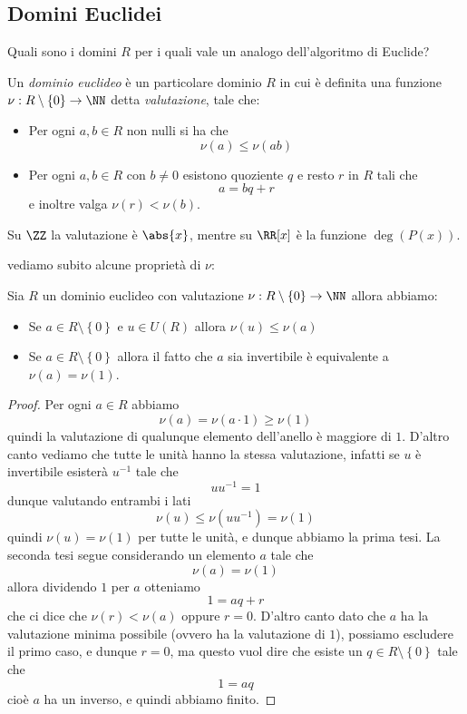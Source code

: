 \documentclass[11pt]{scrartcl}
\begin{document}
	\subsection{Domini Euclidei}
	Quali sono i domini $R$ per i quali vale un analogo dell'algoritmo di Euclide?
	\begin{definition}
		Un \textit{dominio euclideo} è un particolare dominio $R$ in cui è definita una funzione $\nu:R\setminus\left\{0\right\}\to \NN$ detta \textit{valutazione}, tale che:
		\begin{itemize}
			\item Per ogni $a,b\in R$ non nulli si ha che
			$$\nu(a)\le \nu(ab)$$
			\item Per ogni $a,b\in R$ con $b\ne 0$ esistono quoziente $q$ e resto $r$ in $R$ tali che 
			$$a=bq+r$$
			e inoltre valga $\nu(r)<\nu(b)$.
		\end{itemize}
	\end{definition}
	\begin{example}
		Su $\ZZ$ la valutazione è $\abs{x}$, mentre su $\RR[x]$ è la funzione $\deg(P(x))$.
	\end{example}
	vediamo subito alcune proprietà di $\nu$:
	\begin{proposition}
		Sia $R$ un dominio euclideo con valutazione $\nu:R\setminus\left\{0\right\}\to \NN$ allora abbiamo:
		\begin{itemize}
			\item Se $a\in R\setminus\left\{0\right\}$ e $u\in U(R)$ allora $\nu(u)\le \nu(a)$
			\item Se $a\in R\setminus\left\{0\right\}$ allora il fatto che $a$ sia invertibile è equivalente a $\nu(a)=\nu(1)$.
		\end{itemize}
	\end{proposition}
	\begin{proof}
		Per ogni $a\in R$ abbiamo
		$$\nu(a)=\nu(a\cdot 1)\ge \nu(1)$$
		quindi la valutazione di qualunque elemento dell'anello è maggiore di $1$. D'altro canto vediamo che tutte le unità hanno la stessa valutazione, infatti se $u$ è invertibile esisterà $u^{-1}$ tale che 
		$$uu^{-1}=1$$
		dunque valutando entrambi i lati
		$$\nu(u)\le\nu(uu^{-1})=\nu(1)$$
		quindi $\nu(u)=\nu(1)$ per tutte le unità, e dunque abbiamo la prima tesi. La seconda tesi segue considerando un elemento $a$ tale che 
		$$\nu(a)=\nu(1)$$
		allora dividendo $1$ per $a$ otteniamo
		$$1=aq+r$$
		che ci dice che $\nu(r)<\nu(a)$ oppure $r=0$. D'altro canto dato che $a$ ha la valutazione minima possibile (ovvero ha la valutazione di $1$), possiamo escludere il primo caso, e dunque $r=0$, ma questo vuol dire che esiste un $q\in R\setminus\left\{0\right\}$ tale che 
		$$1=aq$$
		cioè $a$ ha un inverso, e quindi abbiamo finito.
	\end{proof}
\end{document}

